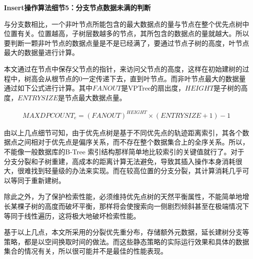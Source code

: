 \textbf{Insert操作算法细节5：分支节点数据未满的判断}

与分支数相比，一个非叶节点所能包含的最大数据点的量与节点在整个优先点树中位置有关。位置越高，子树层数越多的节点，其所包含的数据点的量就越大。所以要判断一颗非叶节点的数据点量是不是已经满了，要通过节点子树的高度，叶节点最大的数据量进行计算。

本文通过在节点中保存父节点的指针，来访问父节点的高度，这样在初始建树的过程中，树高会从根节点的0一定传递下去，直到叶节点。而非叶节点最大的数据量通过如下公式进行计算。其中$FANOUT$是VPTree的扇出度，$HEIGHT$是子树的高度，$ENTRYSIZE$是节点最大数据点量。

\begin{align}
MAXDPCOUNT_{e}=(FANOUT)^{HEIGHT}\times({ENTRYSIZE + 1}) - 1 \end{align}

由以上几点细节可知，由于优先点树是基于不同优先点的轨迹距离索引，其各个数据点之间相对于优先点是偏序关系，而不存在整个数据集合上的全序关系。所以，不能像一般数据库的B-Tree 索引结构那样简单地比较索引的关键值就行了。对于分支分裂和子树重建，高成本的距离计算无法避免，导致其插入操作本身消耗很大，很难找到轻量级的办法来实现。而在较高位置的分支分裂，其计算消耗几乎可以等同于重新建树。

除此之外，为了保护检索性能，必须维持优先点树的天然平衡属性，不能简单地增长某棵子树的高度而破坏平衡，那样将会使搜索向一侧剧烈倾斜甚至在极端情况下等同于线性遍历，这将极大地破坏检索性能。

基于以上几点，本文所采用的分裂优先重分布，存储额外元数据，延长建树分支等策略，都是以空间换取时间的做法。而这些静态策略的实际运行效果和具体的数据集合的情况有关，所以很可能并不是最佳的性能表现。
